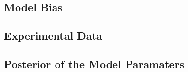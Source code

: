 \subsection{Model Bias}\label{sub:bc_modular_bias}

\subsection{Experimental Data}\label{sub:bc_modular_data}

\subsection{Posterior of the Model Paramaters}\label{sub:bc_modular_posterior}
